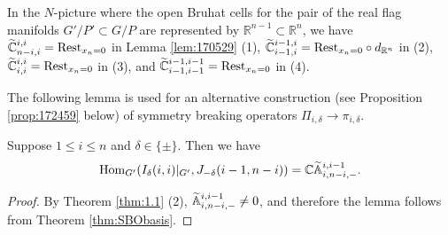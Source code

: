\begin{remark}
\label{rem:170529}
In the $N$-picture
 where the open Bruhat cells
 for the pair of the real flag manifolds
 $G'/P' \subset G/P$
 are represented by ${\mathbb{R}}^{n-1} \subset {\mathbb{R}}^{n}$, 
 we have $\widetilde{{\mathbb{C}}}_{{n-i},{i}}^{{i,i}} ={\operatorname{Rest}}_{x_n=0}$
 in Lemma \ref{lem:170529} (1), 
 $\widetilde{{\mathbb{C}}}_{{i-1},{i}}^{{i-1,i}} ={\operatorname{Rest}}_{x_n=0}
 \circ d_{\mathbb{R}^n}$ in (2), 
$\widetilde{{\mathbb{C}}}_{{i},{i}}^{{i,i}} ={\operatorname{Rest}}_{x_n=0}$
 in (3), 
 and 
 $\widetilde{{\mathbb{C}}}_{{i-1},{i-1}}^{{i-1,i-1}} =
{\operatorname{Rest}}_{x_n=0}$
 in (4).  
\end{remark}

The following lemma is used for an alternative construction
 (see Proposition \ref{prop:172459} below)
 of symmetry breaking operators $\Pi_{i,\delta} \to \pi_{i,\delta}$. 
\begin{lemma}
\label{lem:172459}
Suppose $1 \le i \le n$
 and $\delta \in \{\pm\}$.  
Then we have
\begin{equation*}
{\operatorname{Hom}}_{G'}
     (I_{\delta}(i,i)|_{G'}, J_{-\delta}(i-1,n-i))
=
{\mathbb{C}}{\widetilde{\mathbb{A}}}_{{i},{n-i},{-}}^{{i,i-1}}.  
\end{equation*}
\end{lemma}

\begin{proof}
By Theorem \ref{thm:1.1} (2), 
 ${\widetilde{\mathbb{A}}}_{{i},{n-i},{-}}^{{i,i-1}} \ne 0$, 
 and therefore the lemma follows from Theorem \ref{thm:SBObasis}.  
\end{proof}



